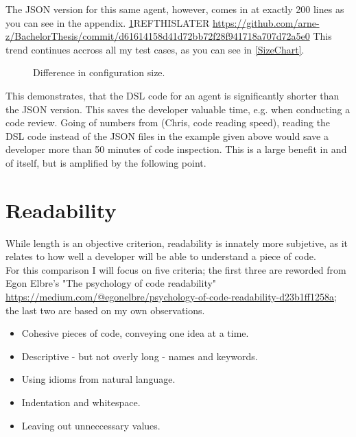 The JSON version for this same agent, however, comes in at exactly 200 lines as you can see in the appendix. \ref{}REFTHISLATER \url{https://github.com/arne-z/BachelorThesis/commit/d61614158d41d72bb72f28f941718a707d72a5e0}
This trend continues accross all my test cases, as you can see in \autoref{SizeChart}.
\begin{figure}
    \centering
    
    \caption{Difference in configuration size.}
    \label{SizeChart}
    
\end{figure}
This demonstrates, that the DSL code for an agent is significantly shorter than the JSON version. This saves the developer valuable time, e.g. when conducting a code review. Going of numbers from \citeNeeded (Chris, code reading speed), reading the DSL code instead of the JSON files in the example given above would save a developer more than 50 minutes of code inspection. This is a large benefit in and of itself, but is amplified by the following point.

\section{Readability}

While length is an objective criterion, readability is innately more subjetive, as it relates to how well a developer will be able to understand a piece of code.\\
For this comparison I will focus on five criteria; the first three are reworded from Egon Elbre's "The psychology of code readability" \citeNeeded \url{https://medium.com/@egonelbre/psychology-of-code-readability-d23b1ff1258a}; the last two are based on my own observations.
\begin{itemize}
    \item Cohesive pieces of code, conveying one idea at a time.
    \item Descriptive - but not overly long - names and keywords.
    \item Using idioms from natural language.
    \item Indentation and whitespace.
    \item Leaving out unneccessary values.
\end{itemize}


